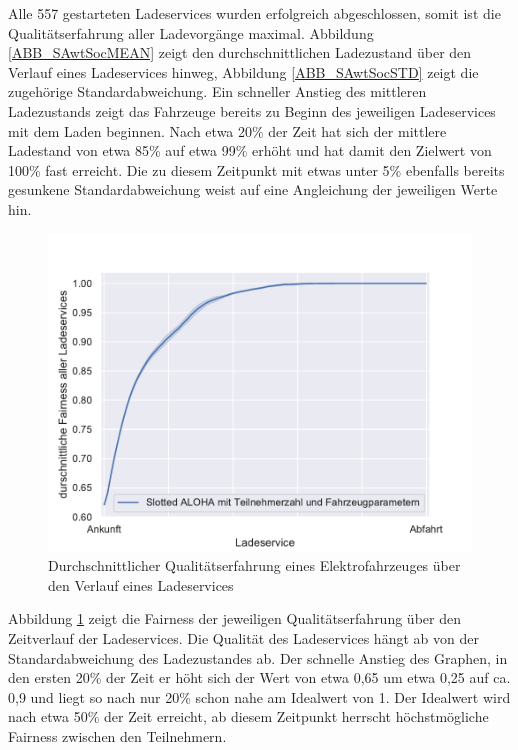 Alle 557 gestarteten Ladeservices wurden erfolgreich abgeschlossen, somit ist die Qualitätserfahrung aller Ladevorgänge maximal. Abbildung \ref{ABB_SAwtSocMEAN} zeigt den durchschnittlichen Ladezustand über den Verlauf eines Ladeservices hinweg, Abbildung \ref{ABB_SAwtSocSTD} zeigt die zugehörige Standardabweichung. Ein schneller Anstieg des mittleren Ladezustands zeigt das Fahrzeuge bereits zu Beginn des jeweiligen Ladeservices mit dem Laden beginnen. Nach etwa 20\% der Zeit hat sich der mittlere Ladestand von etwa 85\% auf etwa 99\% erhöht und hat damit den Zielwert von 100\% fast erreicht. Die zu diesem Zeitpunkt mit etwas unter 5\% ebenfalls bereits gesunkene Standardabweichung weist auf eine Angleichung der jeweiligen Werte hin.\\
\begin{figure}[htb]
\centering
	\includegraphics[scale=0.6]{img/SA_wT/SlottedAloha_waitingTime_VDE_tau_6_qoe.pdf}
	\caption{Durchschnittlicher Qualitätserfahrung eines Elektrofahrzeuges über den Verlauf eines Ladeservices}
	\label{Abb_SAwTFairness}
\end{figure}

Abbildung \ref{Abb_SAwTFairness} zeigt die Fairness der jeweiligen Qualitätserfahrung über den Zeitverlauf der Ladeservices. Die Qualität des Ladeservices hängt ab von der Standardabweichung des Ladezustandes ab. Der schnelle Anstieg des Graphen, in den ersten 20\% der Zeit er höht sich der Wert von etwa 0,65 um etwa 0,25 auf ca. 0,9 und liegt so nach nur 20\% schon nahe am Idealwert von 1. Der Idealwert wird nach etwa 50\% der Zeit erreicht, ab diesem Zeitpunkt herrscht höchstmögliche Fairness zwischen den Teilnehmern.

